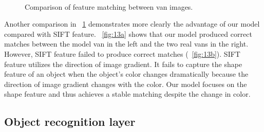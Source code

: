 \documentclass[10pt]{article}
\begin{document}
\begin{figure}
\centering
  \\
\caption{Comparison of feature matching between van images.}
\label{fig:13}
\end{figure}

Another comparison in \figurename~\ref{fig:13} demonstrates
more clearly the advantage of our model compared with SIFT feature.
\figurename~\ref{fig:13a} shows that our model produced correct matches
between the model van in the left and the two real vans in the right. 
However, SIFT feature failed to produce correct matches (\figurename~\ref{fig:13b}). 
SIFT feature utilizes the direction of image gradient. 
It fails to capture the shape feature of an object when
the object's color changes dramatically because the direction of
image gradient changes with the color. 
Our model focuses on the shape feature and thus achieves a stable matching despite
the change in color.


\subsection{Object recognition layer}
\end{document}
